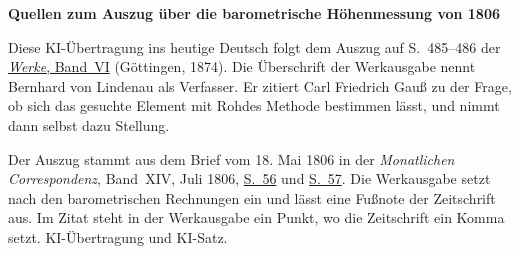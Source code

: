 \clearpage\thispagestyle{empty}
\begin{center}\textbf{Quellen zum Auszug über die barometrische Höhenmessung von 1806}\end{center}
\noindent Diese KI-Übertragung ins heutige Deutsch folgt dem Auszug auf S.~485--486 der \href{https://gdz.sub.uni-goettingen.de/id/PPN236007467}{\textit{Werke}, Band~VI} (Göttingen, 1874). Die Überschrift der Werkausgabe nennt Bernhard von Lindenau als Verfasser. Er zitiert Carl Friedrich Gauß zu der Frage, ob sich das gesuchte Element mit Rohdes Methode bestimmen lässt, und nimmt dann selbst dazu Stellung.
\par\smallskip\noindent Der Auszug stammt aus dem Brief vom 18. Mai 1806 in der \textit{Monatlichen Correspondenz}, Band~XIV, Juli 1806, \href{https://api.digitale-sammlungen.de/iiif/image/v2/bsb10538606_00066/full/1500,/0/default.jpg}{S.~56} und \href{https://api.digitale-sammlungen.de/iiif/image/v2/bsb10538606_00067/full/1500,/0/default.jpg}{S.~57}. Die Werkausgabe setzt nach den barometrischen Rechnungen ein und lässt eine Fußnote der Zeitschrift aus. Im Zitat steht in der Werkausgabe ein Punkt, wo die Zeitschrift ein Komma setzt. KI-Übertragung und KI-Satz.
\clearpage
